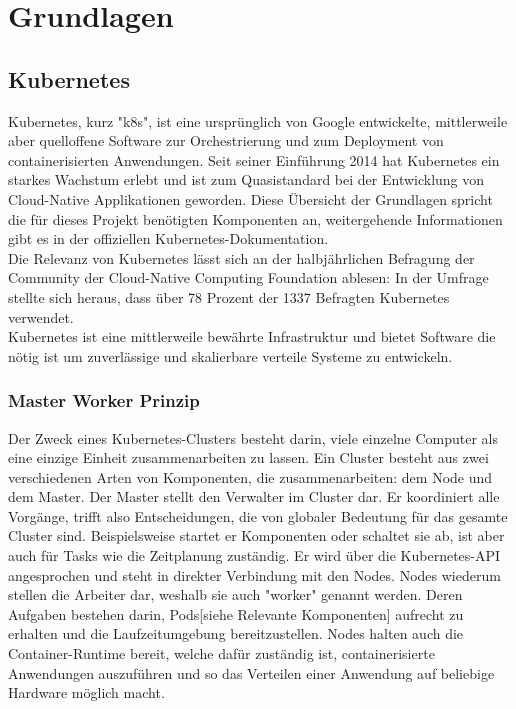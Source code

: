 \documentclass[a4paper,10pt]{scrartcl}
\begin{document}
\pagebreak

\section{Grundlagen}
\subsection{Kubernetes}

Kubernetes, kurz "k8s", ist eine ursprünglich von Google entwickelte, mittlerweile aber quelloffene Software zur Orchestrierung und zum Deployment von containerisierten Anwendungen. Seit seiner Einführung 2014 hat Kubernetes ein starkes Wachstum erlebt und ist zum Quasistandard bei der Entwicklung von Cloud-Native Applikationen geworden.
Diese Übersicht der Grundlagen spricht die für dieses Projekt benötigten Komponenten an, weitergehende Informationen gibt es in der offiziellen Kubernetes-Dokumentation. \cite{.30.05.2020}\\

\glqq Die Relevanz von Kubernetes lässt sich an der halbjährlichen Befragung der Community der Cloud-Native Computing Foundation ablesen:
In der Umfrage stellte sich heraus, dass über 78 Prozent der 1337 Befragten Kubernetes verwendet.\grqq \cite{.2018}\\

Kubernetes ist eine mittlerweile bewährte Infrastruktur und bietet Software die nötig ist um zuverlässige und skalierbare verteile Systeme zu entwickeln. \cite{Burns.2019} \\
\subsubsection{Master Worker Prinzip}
Der Zweck eines Kubernetes-Clusters besteht darin, viele einzelne Computer als eine einzige Einheit zusammenarbeiten zu lassen.
Ein Cluster besteht aus zwei verschiedenen Arten von Komponenten, die zusammenarbeiten:
dem Node und dem Master.
Der Master stellt den Verwalter im Cluster dar. Er koordiniert alle Vorgänge, trifft also Entscheidungen, die von globaler Bedeutung für das gesamte Cluster sind. Beispielsweise startet er Komponenten oder schaltet sie ab, ist aber auch für Tasks wie die Zeitplanung zuständig. Er wird über die Kubernetes-API angesprochen und steht in direkter Verbindung mit den Nodes.
\cite{.20200530T15:19:3404:00} \cite{.20200316T05:14:35+01:00}
Nodes wiederum stellen die Arbeiter dar, weshalb sie auch "worker" genannt werden. Deren Aufgaben bestehen darin, Pods[siehe Relevante Komponenten] aufrecht zu erhalten und die Laufzeitumgebung bereitzustellen. Nodes halten auch die Container-Runtime bereit, welche dafür zuständig ist, containerisierte Anwendungen auszuführen und so das Verteilen einer Anwendung auf beliebige Hardware möglich macht.
\end{document}
